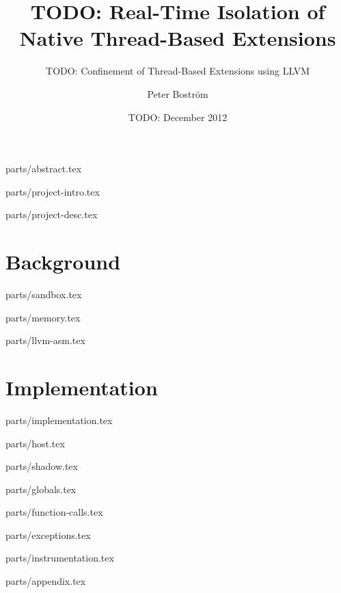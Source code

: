 \documentclass[a4paper,11pt]{xjobb/kth-mag}
\title {TODO: Real-Time Isolation of Native Thread-Based Extensions}
\subtitle {TODO: Confinement of Thread-Based Extensions using LLVM}
\author {Peter Boström}
\date {TODO: December 2012}
\begin{document}
\frontmatter
\pagestyle {empty}
\removepagenumbers
\maketitle
{}

 {parts/abstract.tex}

\clearpage
\tableofcontents*
\mainmatter
\pagestyle {newchap}

 {parts/project-intro.tex}

 {parts/project-desc.tex}


\part {Background}

 {parts/sandbox.tex}

 {parts/memory.tex}

 {parts/llvm-asm.tex}


\part {Implementation}

 {parts/implementation.tex}

 {parts/host.tex}

 {parts/shadow.tex}

 {parts/globals.tex}

 {parts/function-calls.tex}

 {parts/exceptions.tex}

 {parts/instrumentation.tex}


\appendix
\addappheadtotoc

 {parts/appendix.tex}
\end{document}
